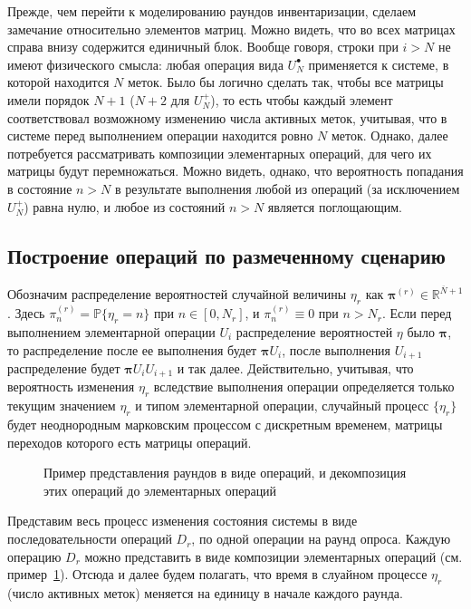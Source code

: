 Прежде, чем перейти к моделированию раундов инвентаризации, сделаем замечание относительно элементов матриц. Можно видеть, что во всех матрицах справа внизу содержится единичный блок. Вообще говоря, строки при $i > N$ не имеют физического смысла: любая операция вида $U^\bullet_N$ применяется к системе, в которой находится $N$ меток. Было бы логично сделать так, чтобы все матрицы имели порядок $N+1$ ($N+2$ для $U_N^+$), то есть чтобы каждый элемент соответствовал возможному изменению числа активных меток, учитывая, что в системе перед выполнением операции находится ровно $N$ меток. Однако, далее потребуется рассматривать композиции элементарных операций, для чего их матрицы будут перемножаться. Можно видеть, однако, что вероятность попадания в состояние $n > N$ в результате выполнения любой из операций (за исключением $U_N^+$) равна нулю, и любое из состояний $n > N$ является поглощающим.




\subsection{Построение операций по размеченному сценарию}\label{subsec:ch3_bg_op_composition}
Обозначим распределение вероятностей случайной величины $\eta_r$ как $\bm{\pi}^{(r)} \in \mathbb{R}^{\overline{N}+1}$. Здесь $\pi_n^{(r)} = \mathbb{P}\{\eta_r = n \}$ при $n \in [0, N_r]$, и $\pi_n^{(r)} \equiv 0$ при $n > N_r$. Если перед выполнением элементарной операции $U_i$ распределение вероятностей $\eta$ было $\bm{\pi}$, то распределение после ее выполнения будет $\bm{\pi}U_i$, после выполнения $U_{i+1}$ распределение будет $\bm{\pi} U_i U_{i+1}$ и так далее. Действительно, учитывая, что вероятность изменения $\eta_r$ вследствие выполнения операции определяется только текущим значением $\eta_r$ и типом элементарной операции, случайный процесс $\{ \eta_r \}$ будет неоднородным марковским процессом с дискретным временем, матрицы переходов которого есть матрицы операций.

\begin{figure}[htb]
  \caption{Пример представления раундов в виде операций, и декомпозиция этих операций до элементарных операций}
  \label{fig:ch3_decomposition}
\end{figure}

Представим весь процесс изменения состояния системы в виде последовательности операций $D_r$, по одной операции на раунд опроса. Каждую операцию $D_r$ можно представить в виде композиции элементарных операций (см. пример~\ref{fig:ch3_decomposition}). Отсюда и далее будем полагать, что время в слуайном процессе $\eta_r$ (число активных меток) меняется на единицу в начале каждого раунда.

